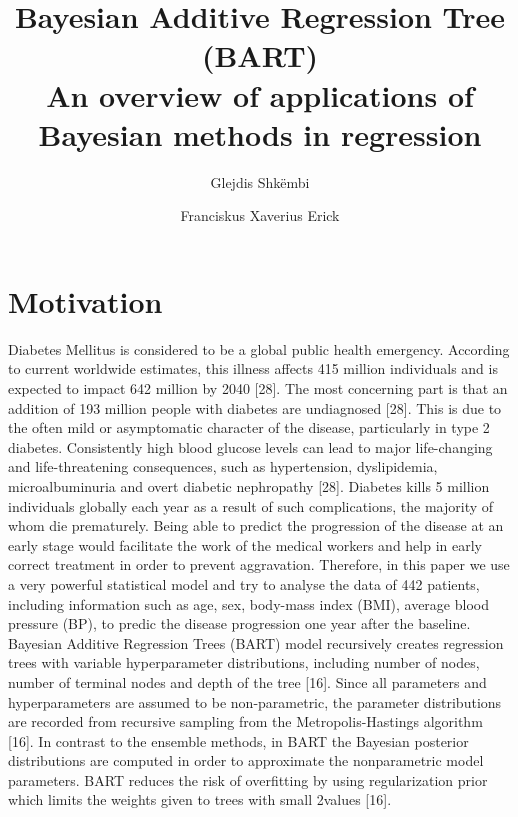 \documentclass{usiinftr}
\begin{document}
\title{\bf Bayesian Additive Regression Tree (BART) \\ {\normalfont An overview of applications of Bayesian methods in regression }}
\author{Glejdis Shk\"embi}{\dagger}
\author{Franciskus Xaverius Erick}{\dagger}


%
%

\maketitle

\begin{abstract}

\end{abstract}

\section{Motivation}
Diabetes Mellitus is considered to be a global public health emergency. According to current worldwide estimates, this illness affects 415 million individuals and is expected to impact 642 million by 2040 [28]. The most concerning part is that an addition of 193 million people with diabetes are undiagnosed [28]. This is due to the often mild or asymptomatic character of the disease, particularly in type 2 diabetes. Consistently high blood glucose levels can lead to major life-changing and life-threatening consequences, such as hypertension, dyslipidemia, microalbuminuria and overt diabetic nephropathy [28]. Diabetes kills 5 million individuals globally each year as a result of such complications, the majority of whom die prematurely. Being able to predict the progression of the disease at an early stage would facilitate the work of the medical workers and help in early correct treatment in order to prevent aggravation.  Therefore, in this paper we use a very powerful statistical model and try to analyse the data of 442 patients, including information such as age, sex, body-mass index (BMI), average blood pressure (BP), to predic the disease progression one year after the baseline. 
Bayesian Additive Regression Trees (BART) model recursively creates regression trees with variable hyperparameter distributions, including number of nodes, number of terminal nodes and depth of the tree [16]. Since all parameters and hyperparameters are assumed to be non-parametric, the parameter distributions are recorded from recursive sampling from the Metropolis-Hastings algorithm [16]. In contrast to the ensemble methods, in BART the Bayesian posterior distributions are computed in order to approximate the nonparametric model parameters. BART reduces the risk of overfitting by using regularization prior which limits the weights given to trees with small 2values [16]. 
\end{document}

